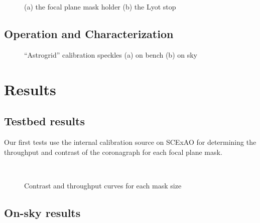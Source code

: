 \documentclass[]{spie}  %
\begin{document}
\begin{figure*}[h!]
   \centering
   \caption{(a) the focal plane mask holder (b) the Lyot stop}\label{fig:optics}
\end{figure*}

\subsection{Operation and Characterization}\label{sec:tests}

\begin{figure*}[h!]
   \centering
   \caption{``Astrogrid'' calibration speckles (a) on bench (b) on sky}\label{fig:satellite-spots}
\end{figure*}

\section{Results}\label{sec:results}

\subsection{Testbed results}\label{sec:testbed}

Our first tests use the internal calibration source on SCExAO for determining the throughput and contrast of the coronagraph for each focal plane mask.

\begin{figure*}[h!]
   \centering
   \\
   \caption{Contrast and throughput curves for each mask size}\label{fig:contrast}
\end{figure*}

\subsection{On-sky results}\label{sec:onsky}
\end{document}
